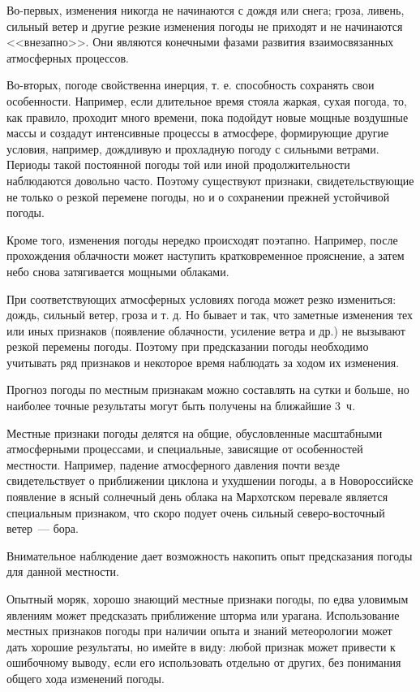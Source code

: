 Во-первых, изменения никогда не начинаются с дождя или снега; гроза,
ливень, сильный ветер и другие резкие изменения погоды не приходят и
не начинаются <<внезапно>>. Они являются конечными фазами развития
взаимосвязанных атмосферных процессов.

Во-вторых, погоде свойственна инерция, т. е. способность сохранять
свои особенности. Например, если длительное время стояла жаркая, сухая
погода, то, как правило, проходит много времени, пока подойдут новые
мощные воздушные массы и создадут интенсивные процессы в атмосфере,
формирующие другие условия, например, дождливую и прохладную погоду с
сильными ветрами. Периоды такой постоянной погоды той или иной
продолжительности наблюдаются довольно часто. Поэтому существуют
признаки, свидетельствующие не только о резкой перемене погоды, но и о
сохранении прежней устойчивой погоды.

Кроме того, изменения погоды нередко происходят поэтапно. Например,
после прохождения облачности может наступить кратковременное
прояснение, а затем небо снова затягивается мощными облаками.

При соответствующих атмосферных условиях погода может резко
измениться: дождь, сильный ветер, гроза и т. д. Но бывает и так, что
заметные изменения тех или иных признаков (появление облачности,
усиление ветра и др.) не вызывают резкой перемены погоды. Поэтому при
предсказании погоды необходимо учитывать ряд признаков и некоторое
время наблюдать за ходом их изменения.

Прогноз погоды по местным признакам можно составлять на сутки и
больше, но наиболее точные результаты могут быть получены на ближайшие
3~ч.

Местные признаки погоды делятся на общие, обусловленные масштабными
атмосферными процессами, и специальные, зависящие от особенностей
местности. Например, падение атмосферного давления почти везде
свидетельствует о приближении циклона и ухудшении погоды, а в
Новороссийске появление в ясный солнечный день облака на Мархотском
перевале является специальным признаком, что скоро подует очень
сильный северо-восточный ветер~--- бора.

Внимательное наблюдение дает возможность накопить опыт предсказания
погоды для данной местности.

Опытный моряк, хорошо знающий местные признаки погоды, по едва
уловимым явлениям может предсказать приближение шторма или
урагана. Использование местных признаков погоды при наличии опыта и
знаний метеорологии может дать хорошие результаты, но имейте в виду:
любой признак может привести к ошибочному выводу, если его
использовать отдельно от других, без понимания общего хода изменений
погоды.


